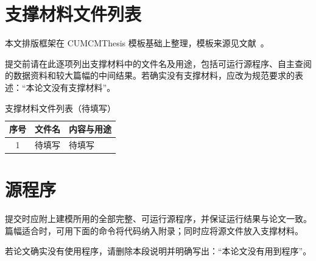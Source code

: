 \documentclass[withoutpreface,bwprint]{cumcmthesis}
\begin{document}
\clearpage
\begin{appendices}

\section{支撑材料文件列表}

本文排版框架在 CUMCMThesis 模板基础上整理，模板来源见文献~\cite{cumcmthesis}。

提交前请在此逐项列出支撑材料中的文件名及用途，包括可运行源程序、自主查阅的数据资料和较大篇幅的中间结果。若确实没有支撑材料，应改为规范要求的表述：“本论文没有支撑材料”。

\begin{table}[H]
  \centering
  \caption{支撑材料文件列表（待填写）}
  \label{tab:supporting-files}
  \begin{tabularx}{0.95\textwidth}{@{}cXX@{}}
    \toprule
    序号 & 文件名 & 内容与用途 \\
    \midrule
    1 & 待填写 & 待填写 \\
    \bottomrule
  \end{tabularx}
\end{table}

\section{源程序}

提交时应附上建模所用的全部完整、可运行源程序，并保证运行结果与论文一致。篇幅适合时，可用下面的命令将代码纳入附录；同时应将源文件放入支撑材料。


若论文确实没有使用程序，请删除本段说明并明确写出：“本论文没有用到程序”。

\end{appendices}
\end{document}
